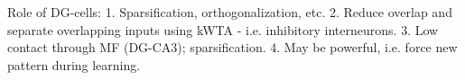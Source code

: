 Role of DG-cells: 
1. Sparsification, orthogonalization, etc.
2. Reduce overlap and separate overlapping inputs using kWTA - i.e. inhibitory interneurons.
3. Low contact through MF (DG-CA3); sparsification.
4. May be powerful, i.e. force new pattern during learning.
\citep{Rolls1998chpt6}

\cleardoublepage